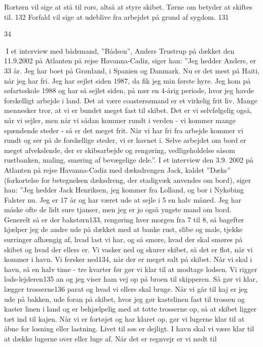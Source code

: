 Rortørn vil sige at stå til rors, altså at styre skibet. Tørne om
betyder at skiftes til. 132 Forfald vil sige at udeblive fra arbejdet på
grund af sygdom. 131

34

I et interview med bådsmand, ''Bådsen'', Anders Trustrup på dækket den
11.9.2002 på Atlanten på rejse Havanna-Cadiz, siger han: ''Jeg hedder
Anders, er 33 år. Jeg har boet på Grønland, i Spanien og Danmark. Nu er
det mest på Haiti, når jeg har fri. Jeg har sejlet siden 1987, da fik
jeg min første hyre. Jeg kom på søfartsskole 1988 og har så sejlet
siden, på nær en 4-årig periode, hvor jeg havde forskelligt arbejde i
land. Det at være coastersømand er et virkelig frit liv. Mange mennesker
tror, at vi er bundet meget fast til skibet. Det er vi selvfølgelig
også, når vi sejler, men når vi sådan kommer rundt i verden - vi kommer
mange spændende steder - så er det meget frit. Når vi har fri fra
arbejde kommer vi rundt og ser på de forskellige steder, vi er havnet i.
Selve arbejdet om bord er meget afvekslende, der er skibsarbejde og
rengøring, vedligeholdelse såsom rustbanken, maling, smøring af
bevægelige dele.''. I et interview den 3.9. 2002 på Atlanten på rejse
Havanna-Cadiz med dæksdrengen Jack, kaldet ''Dæks'' (forkortelse for
betegnelsen dæksdreng, der stadigvæk anvendes om bord), siger han: ''Jeg
hedder Jack Henriksen, jeg kommer fra Lolland, og bor i Nykøbing Falster
nu. Jeg er 17 år og har været ude at sejle i 5 en halv måned. Jeg har
måske ofte de lidt sure tjanser, men jeg er jo også yngste mand om bord.
Generelt så er der bakstørn133, rengøring hver morgen fra 7 til 8, så
bagefter hjælper jeg de andre ude på dækket med at banke rust, slibe og
male, tjekke surringer afhængig af, hvad last vi har, og så smøre, hvad
der skal smøres på skibet og hvad der ellers er. Vi vasker ned og skurer
skibet, så det er flot, når vi kommer i havn. Vi fersker ned134, når der
er meget salt på skibet. Når vi skal i havn, så en halv time - tre
kvarter før gør vi klar til at modtage lodsen. Vi rigger
lods-lejderen135 an og jeg viser ham vej op på broen til skipperen. Så
gør vi klar, lægger trosserne136 parat og hvad vi ellers skal bruge. Når
vi går til kaj er jeg ude på bakken, ude foran på skibet, hvor jeg gør
kastelinen fast til trossen og kaster linen i land og er behjælpelig med
at totte trosserne op, så at skibet ligger tæt ind til kajen. Når vi er
fortøjet og har klaret op, gør vi lugerne klar til at åbne for losning
eller lastning. Livet til søs er dejligt. I havn skal vi være klar til
at dække lugerne over eller luge af. Når det er regnvejr er vi nødt til
